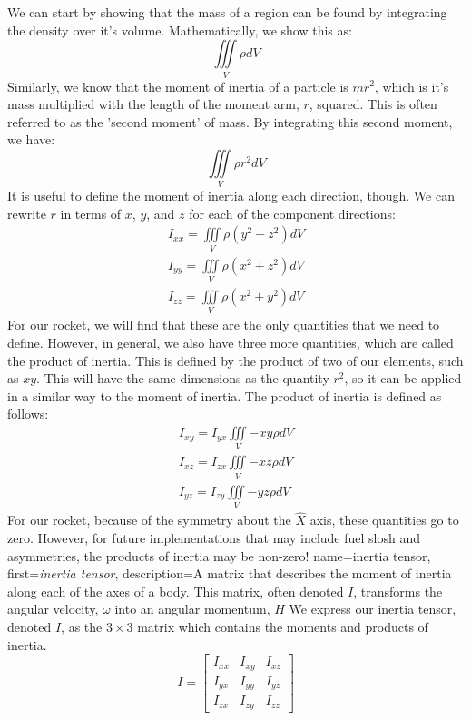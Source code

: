 \documentclass[12pt]{report}
\begin{document}
We can start by showing that the mass of a region can be found by integrating the density over it's volume. Mathematically, we show this as:
$$\iiint\limits_V{\rho}{dV}$$
Similarly, we know that the moment of inertia of a particle is $mr^2$, which is it's mass multiplied with the length of the moment arm, $r$, squared. This is often referred to as the 'second moment' of mass. By integrating this second moment, we have:
$$\iiint\limits_V{\rho}{r^2}{dV}$$
It is useful to define the moment of inertia along each direction, though. We can rewrite $r$ in terms of $x$, $y$, and $z$ for each of the component directions:
\begin{gather}
    I_{xx}=\iiint\limits_V{\rho}{\left(y^2+z^2\right)}{dV}\\
    I_{yy}=\iiint\limits_V{\rho}{\left(x^2+z^2\right)}{dV}\\
    I_{zz}=\iiint\limits_V{\rho}{\left(x^2+y^2\right)}{dV}
\end{gather}
For our rocket, we will find that these are the only quantities that we need to define. However, in general, we also have three more quantities, which are called the product of inertia. This is defined by the product of two of our elements, such as $xy$. This will have the same dimensions as the quantity $r^2$, so it can be applied in a similar way to the moment of inertia. The product of inertia is defined as follows:
\begin{gather}
    I_{xy}=I_{yx}\iiint\limits_V{-xy\rho}{dV}\\
    I_{xz}=I_{zx}\iiint\limits_V{-xz\rho}{dV}\\
    I_{yz}=I_{zy}\iiint\limits_V{-yz\rho}{dV}
\end{gather}
For our rocket, because of the symmetry about the $\hat{X}$ axis, these quantities go to zero. However, for future implementations that may include fuel slosh and asymmetries, the products of inertia may be non-zero!
{
    name={inertia tensor},
    first=\textit{inertia tensor},
    description={A matrix that describes the moment of inertia along each of the axes of a body. This matrix, often denoted $I$, transforms the angular velocity, $\omega$ into an angular momentum, $H$}
}
We express our \gls{inertia tensor}, denoted $I$, as the $3\times3$ matrix which contains the moments and products of inertia.
$$I=\begin{bmatrix}
    I_{xx}&I_{xy}&I_{xz}\\
    I_{yx}&I_{yy}&I_{yz}\\
    I_{zx}&I_{zy}&I_{zz}
\end{bmatrix}$$
\end{document}
